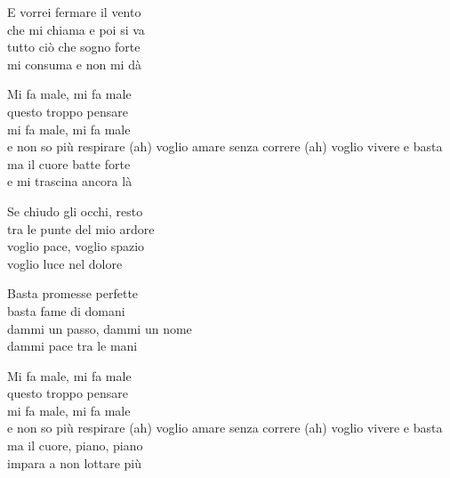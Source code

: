 \begin{lyrics}
E vorrei fermare il vento\\
che mi chiama e poi si va\\
tutto ciò che sogno forte\\
mi consuma e non mi dà

Mi fa male, mi fa male\\
questo troppo pensare\\
mi fa male, mi fa male\\
e non so più respirare
(ah) voglio amare senza correre
(ah) voglio vivere e basta\\
ma il cuore batte forte\\
e mi trascina ancora là

Se chiudo gli occhi, resto\\
tra le punte del mio ardore\\
voglio pace, voglio spazio\\
voglio luce nel dolore

Basta promesse perfette\\
basta fame di domani\\
dammi un passo, dammi un nome\\
dammi pace tra le mani

Mi fa male, mi fa male\\
questo troppo pensare\\
mi fa male, mi fa male\\
e non so più respirare
(ah) voglio amare senza correre
(ah) voglio vivere e basta\\
ma il cuore, piano, piano\\
impara a non lottare più
\end{lyrics}

